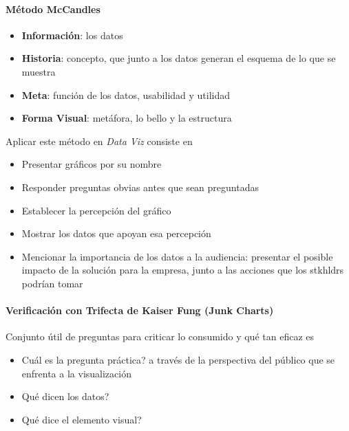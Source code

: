 \paragraph{Método McCandles}
\begin{itemize}
    \item {\textbf{Información}: los datos}
    \item {\textbf{Historia}: concepto, que junto a los datos generan el esquema de lo que se muestra}
    \item {\textbf{Meta}: función de los datos, usabilidad y utilidad}
    \item {\textbf{Forma Visual}: metáfora, lo bello y la estructura}
\end{itemize}
Aplicar este método en \textit{Data Viz} consiste en
\begin{itemize}
    \item {Presentar gráficos por su nombre}
    \item {Responder preguntas obvias antes que sean preguntadas}
    \item {Establecer la percepción del gráfico}
    \item {Mostrar los datos que apoyan esa percepción}
    \item {Mencionar la importancia de los datos a la audiencia: presentar el posible impacto de la solución para la empresa, junto a las acciones que los \gls{stkhldrs} podrían tomar}
\end{itemize}

\paragraph{Verificación con Trifecta de Kaiser Fung (Junk Charts)}
Conjunto útil de preguntas para criticar lo consumido y qué tan eficaz es
\begin{itemize}
    \item {Cuál es la pregunta práctica? a través de la perspectiva del público que se enfrenta a la visualización}
    \item {Qué dicen los datos?}
    \item {Qué dice el elemento visual?}
\end{itemize}

